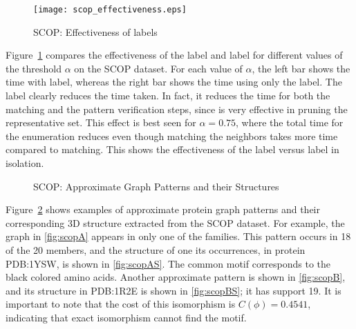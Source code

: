 \begin{figure}[!ht]
  \centerline{
    \texttt{[image: scop\_effectiveness.eps]}
	}
	\caption{SCOP: Effectiveness of labels}
    \label{fig:D5F20P_eff}
\end{figure}

Figure~\ref{fig:D5F20P_eff} compares the effectiveness of the \ncl
label and \khop label for different values of the
threshold $\alpha$ on the SCOP dataset.  For each value of $\alpha$, the
left bar shows the time with \ncl label, whereas the right bar
shows the time using only the \khop label.  The \ncl label clearly
reduces the time taken. In fact, it reduces the time for both the \khop
matching and the pattern verification steps, since \ncl is very
effective in pruning the representative set.  This effect is best seen
for $\alpha = 0.75$, where the total time for the enumeration reduces
even though matching the neighbors takes more time compared to \khop
matching.  This shows the effectiveness of the \ncl label versus
\khop label in isolation.

\begin{figure}[!ht]
  \centerline{
	}
	\centerline{
	}
	\caption{SCOP: Approximate Graph Patterns and their Structures}
	\label{fig:scoppats}
\end{figure}


\smallskip{}
Figure~\ref{fig:scoppats} shows examples of approximate protein graph
patterns and their corresponding 3D structure extracted from the SCOP
dataset.  For example, the graph in \ref{fig:scopA} appears in only one of
the families. This pattern occurs in 18 of the 20 members, and the
structure of one its occurrences, in protein PDB:1YSW, is shown in
\ref{fig:scopAS}. The common motif corresponds to the black colored
amino acids.  Another approximate pattern is shown in \ref{fig:scopB},
and its structure in PDB:1R2E is shown in \ref{fig:scopBS}; it has
support 19.  It is important to note that the cost of this isomorphism
is $C(\phi) = 0.4541$, indicating that exact isomorphism cannot find the
motif.

